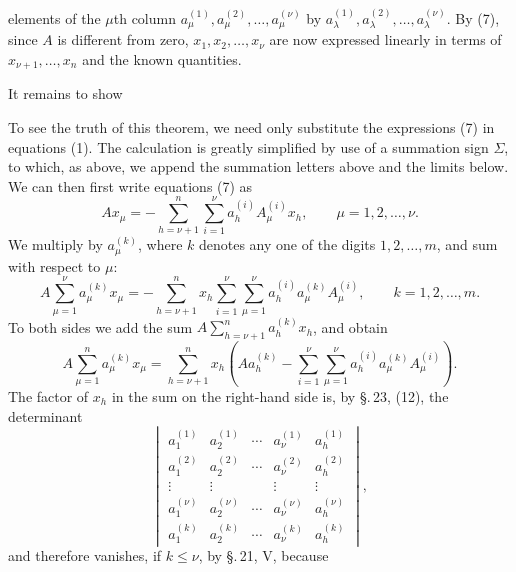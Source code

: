 
elements of the \(\mu\)th column \(a_\mu^{(1)},a_\mu^{(2)},\ldots,a_\mu^{(\nu)}\) by \(a_\lambda^{(1)},a_\lambda^{(2)},\ldots,a_\lambda^{(\nu)}\). By (7), since \(A\) is different from zero, \(x_1,x_2,\ldots,x_\nu\) are now expressed linearly in terms of \(x_{\nu+1},\ldots,x_n\) and the known quantities.

It remains to show


To see the truth of this theorem, we need only substitute the expressions (7) in equations (1). The calculation is greatly simplified by use of a summation sign \(\Sigma\), to which, as above, we append the summation letters above and the limits below. We can then first write equations (7) as
\begin{equation}
 A x_\mu=-\sum_{h=\nu+1}^{n}\sum_{i=1}^{\nu}a_h^{(i)}A_\mu^{(i)}x_h,
 \qquad \mu=1,2,\ldots,\nu.
\tag{9}
\end{equation}
We multiply by \(a_\mu^{(k)}\), where \(k\) denotes any one of the digits \(1,2,\ldots,m\), and sum with respect to \(\mu\):
\begin{equation}
 A\sum_{\mu=1}^{\nu}a_\mu^{(k)}x_\mu
 =-\sum_{h=\nu+1}^{n}x_h\sum_{i=1}^{\nu}\sum_{\mu=1}^{\nu}
 a_h^{(i)}a_\mu^{(k)}A_\mu^{(i)},
 \qquad k=1,2,\ldots,m.
\tag{10}
\end{equation}
To both sides we add the sum \(A\sum_{h=\nu+1}^{n}a_h^{(k)}x_h\), and obtain
\begin{equation}
 A\sum_{\mu=1}^{n}a_\mu^{(k)}x_\mu
 =\sum_{h=\nu+1}^{n}x_h\left(Aa_h^{(k)}-
 \sum_{i=1}^{\nu}\sum_{\mu=1}^{\nu}a_h^{(i)}a_\mu^{(k)}A_\mu^{(i)}\right).
\tag{11}
\end{equation}
The factor of \(x_h\) in the sum on the right-hand side is, by \S.\,23, (12), the determinant
\begin{equation}
\begin{vmatrix}
 a_1^{(1)}&a_2^{(1)}&\cdots&a_\nu^{(1)}&a_h^{(1)}\\
 a_1^{(2)}&a_2^{(2)}&\cdots&a_\nu^{(2)}&a_h^{(2)}\\
 \vdots&\vdots&&\vdots&\vdots\\
 a_1^{(\nu)}&a_2^{(\nu)}&\cdots&a_\nu^{(\nu)}&a_h^{(\nu)}\\
 a_1^{(k)}&a_2^{(k)}&\cdots&a_\nu^{(k)}&a_h^{(k)}
\end{vmatrix},
\tag{12}
\end{equation}
and therefore vanishes, if \(k\le\nu\), by \S.\,21, V, because
